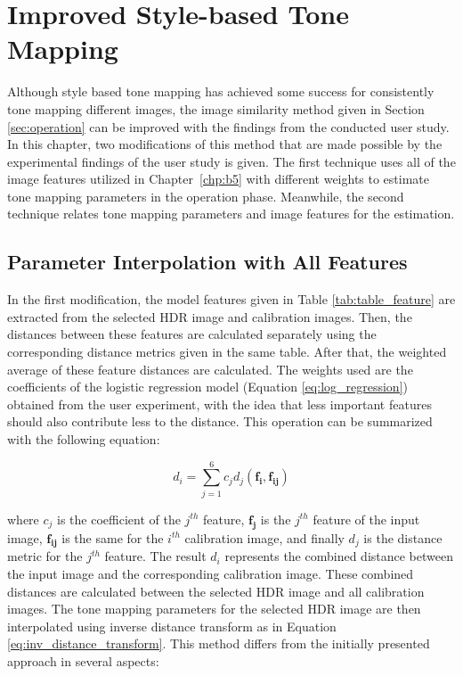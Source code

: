 \chapter{Improved Style-based Tone Mapping}
\label{chp:b6}

Although style based tone mapping has achieved some success for consistently tone mapping different images, the image similarity method given in Section \ref{sec:operation} can be improved with the findings from the conducted user study. In this chapter, two modifications of this method that are made possible by the experimental findings of the user study is given. The first technique uses all of the image features utilized in Chapter~\ref{chp:b5} with different weights to estimate tone mapping parameters in the operation phase. Meanwhile, the second technique relates tone mapping parameters and image features for the estimation.

\section{Parameter Interpolation with All Features}
\label{sec:all_features}

In the first modification, the model features given in Table \ref{tab:table_feature} are extracted from the selected HDR image and calibration images. Then, the distances between these features are calculated separately using the corresponding distance metrics given in the same table. After that, the weighted average of these feature distances are calculated. The weights used are the coefficients of the logistic regression model (Equation \ref{eq:log_regression}) obtained from the user experiment, with the idea that less important features should also contribute less to the distance. This operation can be summarized with the following equation:

\begin{equation}
    d_i = \sum_{j=1}^{6}c_j d_j(\mathbf{f_i}, \mathbf{f_{ij}})
\end{equation}

where $c_j$ is the coefficient of the $j^{th}$ feature, $\mathbf{f_j}$ is the $j^{th}$ feature of the input image, $\mathbf{f_{ij}}$ is the same for the $i^{th}$ calibration image, and finally $d_j$ is the distance metric for the $j^{th}$ feature. The result $d_i$ represents the combined distance between the input image and the corresponding calibration image. These combined distances are calculated between the selected HDR image and all calibration images. The tone mapping parameters for the selected HDR image are then interpolated using inverse distance transform as in Equation \ref{eq:inv_distance_transform}. This method differs from the initially presented approach in several aspects: 

